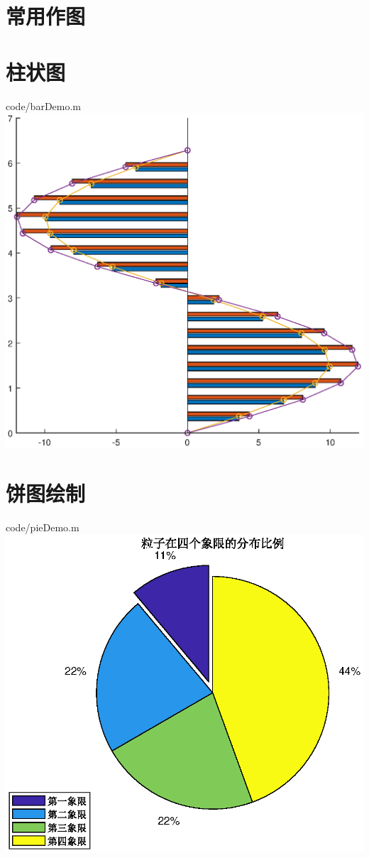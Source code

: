\documentclass{hfutpaper}
\makeatletter
\newcommand{\figcaption}{\def\@captype{figure}\caption}
\makeatother
\begin{document}
\section{常用作图}
\section*{柱状图}

{code/barDemo.m}
\includegraphics{figure/bar.eps}
\figcaption{水平柱状图绘制}
\section*{饼图绘制}

{code/pieDemo.m}
\includegraphics{figure/pie.eps}
\figcaption{饼图绘制}
\end{document}
